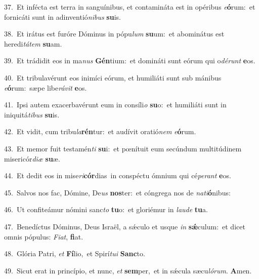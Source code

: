 {\numbfont\textcolor{\numbcolor}{37.}}~Et infécta est terra in sanguínibus, et contamináta est in opéribus \textit{e}\-\textbf{ó}rum:~\star et fornicáti sunt in adinventió\-\textit{ni}\-\textit{bus} \textbf{su}\-is.\par
{\numbfont\textcolor{\numbcolor}{38.}}~Et irátus est furóre Dóminus in pópu\textit{lum} \textbf{su}\-um:~\star et abominátus est heredi\-\textit{tá}\-\textit{tem} \textbf{su}\-am.\par
{\numbfont\textcolor{\numbcolor}{39.}}~Et trádidit eos in ma\textit{nus} \textbf{Gén}\-tium:~\star et domináti sunt eórum qui o\-\textit{dé}\-\textit{runt} \textbf{e}\-os.\par
{\numbfont\textcolor{\numbcolor}{40.}}~Et tribulavérunt eos inimíci eórum, et humiliáti sunt sub mánibus \textit{e}\-\textbf{ó}rum:~\star sæpe libe\-\textit{rá}\-\textit{vit} \textbf{e}\-os.\par
{\numbfont\textcolor{\numbcolor}{41.}}~Ipsi autem exacerbavérunt eum in consíli\textit{o} \textbf{su}\-o:~\star et humiliáti sunt in iniquitá\-\textit{ti}\-\textit{bus} \textbf{su}\-is.\par
{\numbfont\textcolor{\numbcolor}{42.}}~Et vidit, cum tribu\-\textit{la}\-\textbf{rén}tur:~\star et audívit oratió\textit{nem} \textit{e}\-\textbf{ó}rum.\par
{\numbfont\textcolor{\numbcolor}{43.}}~Et memor fuit testamén\textit{ti} \textbf{su}\-i:~\star et pœnítuit eum secúndum multitúdinem misericór\-\textit{di}\-\textit{æ} \textbf{su}\-æ.\par
{\numbfont\textcolor{\numbcolor}{44.}}~Et dedit eos in mise\-\textit{ri}\-\textbf{cór}dias~\star in conspéctu ómnium qui cé\-\textit{pe}\-\textit{rant} \textbf{e}\-os.\par
{\numbfont\textcolor{\numbcolor}{45.}}~Salvos nos fac, Dómine, De\textit{us} \textbf{nos}\-ter:~\star et cóngrega nos de \textit{na}\-\textit{ti}\textbf{ó}nibus:\par
{\numbfont\textcolor{\numbcolor}{46.}}~Ut confiteámur nómini sanc\textit{to} \textbf{tu}\-o:~\star et gloriémur in \textit{lau}\-\textit{de} \textbf{tu}\-a.\par
{\numbfont\textcolor{\numbcolor}{47.}}~Benedíctus Dóminus, Deus Israël, a sǽculo et usque \textit{in} \textbf{sǽ}\-culum:~\star et dicet omnis pópulus: \textit{Fi}\-\textit{at}, \textbf{fi}\-at.\par
{\numbfont\textcolor{\numbcolor}{48.}}~Glória Patri, \textit{et} \textbf{Fí}\-lio,~\star et Spirí\-\textit{tu}\-\textit{i} \textbf{Sanc}\-to.\par
{\numbfont\textcolor{\numbcolor}{49.}}~Sicut erat in princípio, et nunc, \textit{et} \textbf{sem}\-per,~\star et in sǽcula sæcu\-\textit{ló}\-\textit{rum}. \textbf{A}\-men.\par
